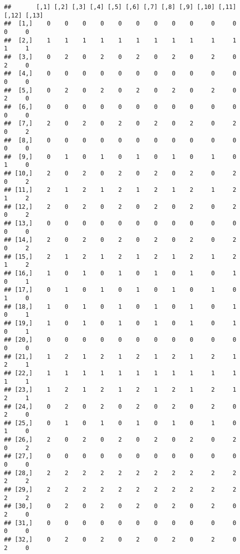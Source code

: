 \documentclass[
]{article}
\begin{document}
\begin{verbatim}
##       [,1] [,2] [,3] [,4] [,5] [,6] [,7] [,8] [,9] [,10] [,11] [,12] [,13]
##  [1,]    0    0    0    0    0    0    0    0    0     0     0     0     0
##  [2,]    1    1    1    1    1    1    1    1    1     1     1     1     1
##  [3,]    0    2    0    2    0    2    0    2    0     2     0     2     0
##  [4,]    0    0    0    0    0    0    0    0    0     0     0     0     0
##  [5,]    0    2    0    2    0    2    0    2    0     2     0     2     0
##  [6,]    0    0    0    0    0    0    0    0    0     0     0     0     0
##  [7,]    2    0    2    0    2    0    2    0    2     0     2     0     2
##  [8,]    0    0    0    0    0    0    0    0    0     0     0     0     0
##  [9,]    0    1    0    1    0    1    0    1    0     1     0     1     0
## [10,]    2    0    2    0    2    0    2    0    2     0     2     0     2
## [11,]    2    1    2    1    2    1    2    1    2     1     2     1     2
## [12,]    2    0    2    0    2    0    2    0    2     0     2     0     2
## [13,]    0    0    0    0    0    0    0    0    0     0     0     0     0
## [14,]    2    0    2    0    2    0    2    0    2     0     2     0     2
## [15,]    2    1    2    1    2    1    2    1    2     1     2     1     2
## [16,]    1    0    1    0    1    0    1    0    1     0     1     0     1
## [17,]    0    1    0    1    0    1    0    1    0     1     0     1     0
## [18,]    1    0    1    0    1    0    1    0    1     0     1     0     1
## [19,]    1    0    1    0    1    0    1    0    1     0     1     0     1
## [20,]    0    0    0    0    0    0    0    0    0     0     0     0     0
## [21,]    1    2    1    2    1    2    1    2    1     2     1     2     1
## [22,]    1    1    1    1    1    1    1    1    1     1     1     1     1
## [23,]    1    2    1    2    1    2    1    2    1     2     1     2     1
## [24,]    0    2    0    2    0    2    0    2    0     2     0     2     0
## [25,]    0    1    0    1    0    1    0    1    0     1     0     1     0
## [26,]    2    0    2    0    2    0    2    0    2     0     2     0     2
## [27,]    0    0    0    0    0    0    0    0    0     0     0     0     0
## [28,]    2    2    2    2    2    2    2    2    2     2     2     2     2
## [29,]    2    2    2    2    2    2    2    2    2     2     2     2     2
## [30,]    0    2    0    2    0    2    0    2    0     2     0     2     0
## [31,]    0    0    0    0    0    0    0    0    0     0     0     0     0
## [32,]    0    2    0    2    0    2    0    2    0     2     0     2     0

\end{verbatim}
\end{document}
